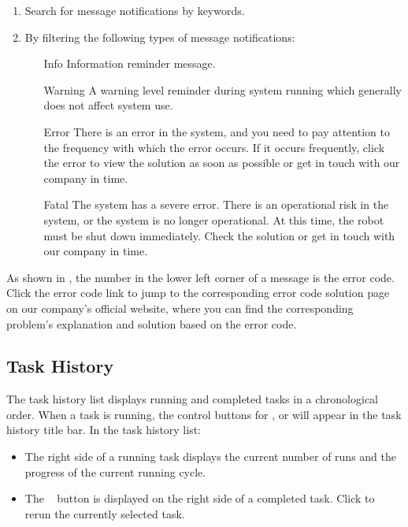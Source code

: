 \begin{enumerate}
	\item Search for message notifications by keywords.
	\item By filtering the following types of message notifications:
	\begin{itemize}
\item[\icn{image/29.pdf} Info] Information reminder message.
\item[\icn{image/28.pdf} Warning] A warning level reminder during system running which generally does not affect system use.
\item[\icn{image/27.pdf} Error] There is an error in the system, and you need to pay attention to the frequency with which the error occurs. If it occurs frequently, click the error to view the solution as soon as possible or get in touch with our company in time.
\item[\icn{image/26.pdf} Fatal] The system has a severe error. There is an operational risk in the system, or the system is no longer operational. At this time, the robot must be shut down immediately. Check the solution or get in touch with our company in time.
	\end{itemize}
\end{enumerate}

As shown in ,
the number in the lower left corner of a message is the error code. Click the error code link to jump to the corresponding error code solution page on our company's official website, where you can find the corresponding problem's explanation and solution based on the error code.

\subsection{Task History}
\label{sec:任务历史}
The task history list displays running and completed tasks in a chronological order. When a task is running, the control buttons for ,  or  will appear in the task history title bar. In the task history list:
\begin{itemize}
	\item The right side of a running task displays the current number of runs and the progress of the current running cycle.
	\item The ~ button is displayed on the right side of a completed task. Click to rerun the currently selected task.
\end{itemize}

